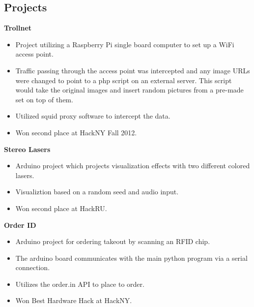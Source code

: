 \documentclass[margin]{res}
\begin{document}
\begin{resume}

\section{Projects}

	{\bf Trollnet}
	\begin{itemize} \itemsep -2pt
		\item Project utilizing a Raspberry Pi single board computer to set up a WiFi access point.
		\item Traffic passing through the access point was intercepted and any image URLs were changed to point to a php script on an external server. This script would take the original images and insert random pictures from a pre-made set on top of them.
		\item Utilized squid proxy software to intercept the data.
		\item Won second place at HackNY Fall 2012.
	\end{itemize}

	{\bf Stereo Lasers}
	\begin{itemize} \itemsep -2pt
		\item Arduino project which projects visualization effects with two different colored lasers.
		\item Visualiztion based on a random seed and audio input.
		\item Won second place at HackRU.
	\end{itemize}

	{\bf Order ID}
	\begin{itemize} \itemsep -2pt
		\item Arduino project for ordering takeout by scanning an RFID chip.
		\item The arduino board communicates with the main python program via a serial connection.
		\item Utilizes the order.in API to place to order.
		\item Won Best Hardware Hack at HackNY.
	\end{itemize}

\end{resume}
\end{document}
